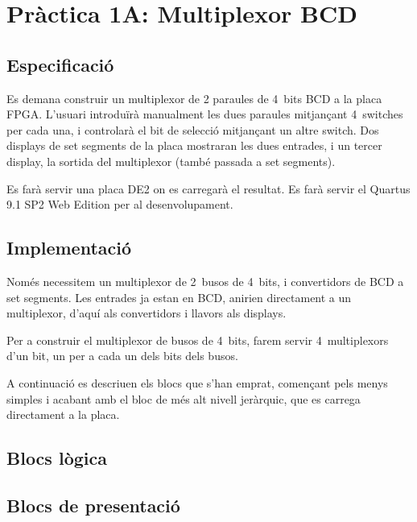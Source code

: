 \chapter{Pràctica 1A: Multiplexor BCD}

\section{Especificació}

Es demana construir un multiplexor de 2 paraules de 4~bits BCD a la placa FPGA.
L'usuari introduïrà manualment les dues paraules mitjançant 4~switches per cada
una, i controlarà el bit de selecció mitjançant un altre switch. Dos displays
de set segments de la placa mostraran les dues entrades, i un tercer display,
la sortida del multiplexor (també passada a set segments).

Es farà servir una placa DE2 on es carregarà el resultat. Es farà servir el
Quartus 9.1 SP2 Web Edition per al desenvolupament.

\section{Implementació}

Només necessitem un multiplexor de 2~busos de 4~bits, i convertidors de BCD
a set segments. Les entrades ja estan en BCD, anirien directament a un multiplexor, d'aquí als convertidors i llavors als displays.

Per a construir el multiplexor de busos de 4~bits, farem servir 4~multiplexors d'un
bit, un per a cada un dels bits dels busos.

A continuació es descriuen els blocs que s'han emprat, començant pels menys
simples i acabant amb el bloc de més alt nivell jeràrquic, que es carrega
directament a la placa.

  \cclearpage
\section{Blocs lògica}
  \cclearpage
{}

  \cclearpage
\section{Blocs de presentació}
  \cclearpage
{}





